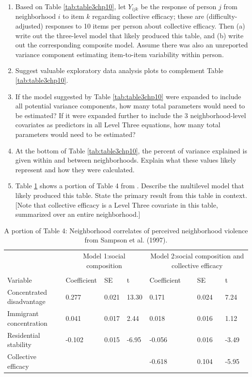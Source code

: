 \documentclass[
]{krantz}
\begin{document}
\begin{enumerate}
\def\labelenumi{\arabic{enumi}.}
\setcounter{enumi}{18}
\item
  Based on Table \ref{tab:table3chp10}, let \(Y_{ijk}\) be the response of person \(j\) from neighborhood \(i\) to item \(k\) regarding collective efficacy; these are (difficulty-adjusted) responses to 10 items per person about collective efficacy. Then (a) write out the three-level model that likely produced this table, and (b) write out the corresponding composite model. Assume there was also an unreported variance component estimating item-to-item variability within person.
\item
  Suggest valuable exploratory data analysis plots to complement Table \ref{tab:table3chp10}.
\item
  If the model suggested by Table \ref{tab:table3chp10} were expanded to include all potential variance components, how many total parameters would need to be estimated? If it were expanded further to include the 3 neighborhood-level covariates as predictors in all Level Three equations, how many total parameters would need to be estimated?
\item
  At the bottom of Table \ref{tab:table3chp10}, the percent of variance explained is given within and between neighborhoods. Explain what these values likely represent and how they were calculated.
\item
  Table \ref{tab:table4chp10} shows a portion of Table 4 from \citet{Sampson1997}. Describe the multilevel model that likely produced this table. State the primary result from this table in context. {[}Note that collective efficacy is a Level Three covariate in this table, summarized over an entire neighborhood.{]}
\end{enumerate}

\begin{table}[t]

\caption{\label{tab:table4chp10}A portion of Table 4: Neighborhood correlates of perceived neighborhood violence from Sampson et al. (1997).}
\centering
\begin{tabular}{lllllll}
\toprule
\multicolumn{1}{c}{ } & \multicolumn{3}{c}{Model 1:social composition} & \multicolumn{3}{c}{Model 2:social composition and collective efficacy} \\
\cmidrule(l{2pt}r{2pt}){2-4} \cmidrule(l{2pt}r{2pt}){5-7}
  &   &   &   &   &   &  \\
\midrule
Variable & Coefficient & SE & t & Coefficient & SE & t\\
Concentrated disadvantage & 0.277 & 0.021 & 13.30 & 0.171 & 0.024 & 7.24\\
Immigrant concentration & 0.041 & 0.017 & 2.44 & 0.018 & 0.016 & 1.12\\
Residential stability & -0.102 & 0.015 & -6.95 & -0.056 & 0.016 & -3.49\\
Collective efficacy &  &  &  & -0.618 & 0.104 & -5.95\\
\bottomrule
\end{tabular}
\end{table}
\end{document}
